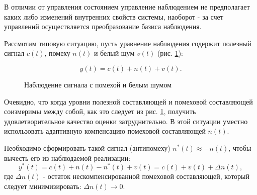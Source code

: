 В отличии от управления состоянием управление наблюдением не предполагает каких либо изменений внутренних свойств системы, наоборот - за счет управлений осуществляется преобразование базиса наблюдения.

Рассмотим типовую ситуацию, пусть уравнение наблюдения содержит полезный сигнал $c(t)$, помеху $n(t)$ и белый шум $v(t)$ (рис. \ref{fig:man_1}):

\begin{equation}\label{eq41:man7}
y(t)=c(t)+n(t)+v(t).
\end{equation}

\begin{figure}[!h]

\centering
{} 
\caption{Наблюдение сигнала с помехой и белым шумом}
\label{fig:man_1}
\end{figure}


Очевидно, что когда уровни полезной составляющей и помеховой составляющей соизмеримы между собой, как это следует из рис. \ref{fig:man_1}, получить удовлетворительное качество оценки затруднительно. 
В этой ситуации уместно использовать адаптивную компенсацию помеховой составляющей $n(t)$.

Необходимо сформировать такой сигнал (антипомеху) $n^*(t)\approx-n(t)$, чтобы вычесть его из наблюдаемой реализации:
\begin{equation}\label{eq41:man8}
y^*(t)=c(t)+n(t)-n^*(t)+v(t)=c(t)+v(t)+\Delta n(t),
\end{equation}
\noindent где $\Delta n(t)$ - остаток нескомпенсированной помеховой составляющей, который следует минимизировать: $\Delta n(t)\longrightarrow 0$.

